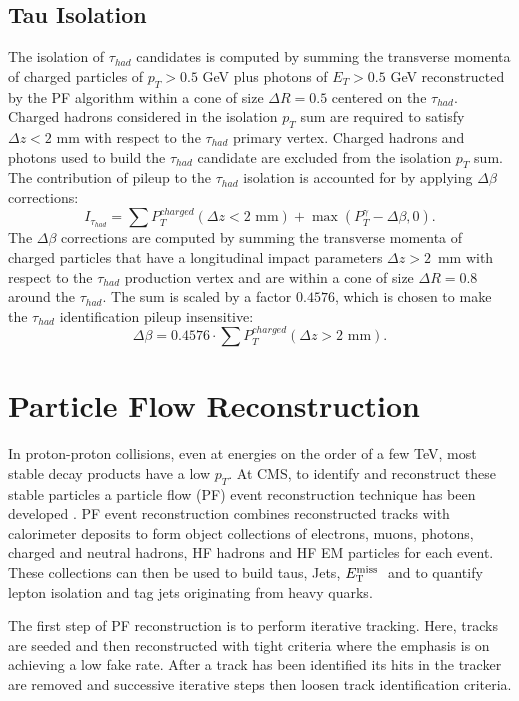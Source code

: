\subsection{Tau Isolation}
The isolation of $\tau_{had}$ candidates is computed
by summing the transverse momenta of charged particles 
of $p_{T} > 0.5$ GeV plus photons of $E_{T} > 0.5$ GeV 
reconstructed by the PF algorithm
within a cone of size $\Delta R = 0.5$ centered on the $\tau_{had}$.
Charged hadrons considered in the isolation $p_{T}$ sum 
are required to satisfy $\Delta z < 2$ mm with respect to the 
$\tau_{had}$ primary vertex.
Charged hadrons and photons used to build the $\tau_{had}$ candidate 
are excluded from the isolation $p_{T}$ sum.
The contribution of pileup to the $\tau_{had}$ isolation 
is accounted for by applying $\Delta \beta$ corrections:
\begin{equation*}
I_{\tau_{had}} = \sum P_{T}^{charged} (\Delta z < 2\mbox{~mm}) + \max \left( P_{T}^{\gamma} - \Delta \beta, 0 \right).
\end{equation*}
The $\Delta \beta$ corrections are computed by summing the transverse
momenta of charged particles that have a longitudinal impact 
parameters $\Delta z > 2$~mm with respect to the 
$\tau_{had}$ production vertex
and are within a cone of size $\Delta R = 0.8$ around the $\tau_{had}$.
The sum is scaled by a factor $0.4576$, which is chosen to 
make the $\tau_{had}$ identification pileup insensitive:
\begin{equation*}
\Delta \beta = 0.4576 \cdot \sum P_{T}^{charged} (\Delta z > 2\mbox{~mm}).
\end{equation*}

\section{Particle Flow Reconstruction}
In proton-proton collisions, even at energies on the order of a few TeV, 
most stable decay products have a low $p_{T}$.
At CMS, to identify and reconstruct these stable particles a particle flow (PF) event 
reconstruction technique has been developed \cite{PFT09001}\cite{PFT10003}. 
PF event reconstruction combines 
reconstructed tracks with calorimeter deposits
to form object collections of 
electrons, muons, photons, charged and neutral hadrons, HF hadrons and HF EM particles
for each event. These collections can then be used to build taus, Jets, $E_\mathrm{T}^{\mathrm{miss}}\;$
and to quantify lepton isolation and tag jets originating from heavy quarks.

The first step of PF reconstruction is to perform
iterative tracking. Here, tracks are seeded and then reconstructed with tight criteria
where the emphasis is on achieving a low fake rate. 
After a track has been identified its hits in the tracker are removed and successive iterative steps
then loosen track identification criteria.

